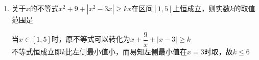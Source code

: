 \begin{enumerate}
\begin{enumerate}
        \begin{jieda}
            \begin{enumerate}
                \item 方法1：看做是关于$p$的一元一次不等式求解 \\
                不等式移项得到$x^2 -4x + 3 > (1-x)p$。\\
                因式分解有$(x-1)(x-3) > -p(x-1)$ \\
                下面根据$x$的取值范围进行分类讨论：
                综上，当$x \in (-\infty, -1) \cup (3, +\infty)$时不等式恒成立。
                \item 方法2：看做是关于$x$的一元二次不等式求解 \\
                不等式移项得到$x^2 + (p-4)x + (3-p) > 0$。即$(x-(3-p))(x-1) > 0$ \\
                因此根据两解可以写出不等式的解集为$\left \{
                    \begin{array}{ll}
                         (-\infty, 3-p) \cup (1, +\infty) & 4 \geq p \geq 2 \\
                         (-\infty, 1) \cup (3-p, +\infty) & 0 \leq p < 2
                    \end{array}
                \right. $ \\
                要使得不等式在$p$取到$[0, 4]$内任意值时成立，则应取所有$p$所对应的解集的交集，故当$x \in (-\infty, -1) \cup (3, +\infty)$时不等式恒成立。
            \end{enumerate}
            \ps 通过对比可知以$p$为主元更容易理解和推广。
        \end{jieda}
        \item 关于$x$的不等式$x^2+9+|x^2-3x| \geq kx$在区间$[1,5]$上恒成立，则实数$k$的取值范围是
        \begin{jieda}
            当$x \in [1, 5]$时，原不等式可以转化为$x + \dfrac{9}{x} + |x - 3| \geq k$ \\
            不等式恒成立即$k$比左侧最小值小，而易知左侧最小值在$x = 3$时取，故$k \leq 6$

\end{jieda}
\end{enumerate}
\end{enumerate}
